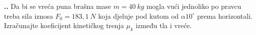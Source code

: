 

\noindent 
\textbf{
\thecjelina.\thezadatak.}
Da bi se vreća puna brašna mase $m=40\ kg$ mogla vući jednoliko po pravcu treba sila iznosa $F_0=183,1\ N$ koja djeluje pod kutom od $\alpha10^\circ$ prema horizontali. Izračunajte koeficijent kinetičkog trenja $\mu_k$ između tla i vreće. 
